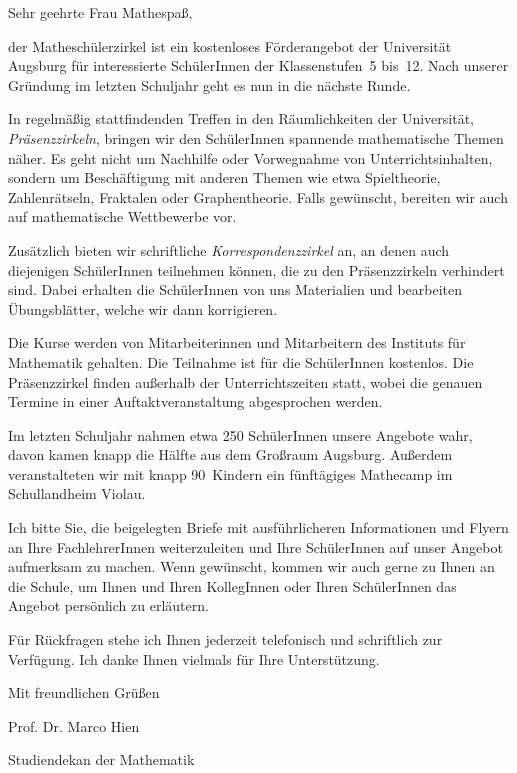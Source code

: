 \documentclass{zirkelbrief}
\begin{document}
\renewcommand{\anschrift}{%
      Holbein-Gymnasium Augsburg \\
      Fachbereich Mathematik \\
      Hallstraße 10 \\
      86150 Augsburg}
\renewcommand{\datum}{22.9.2014}
\renewcommand{\betreff}{Matheschülerzirkel der Universität Augsburg}

\makeletterhead

Sehr geehrte Frau Mathespaß,

der Matheschülerzirkel ist ein kostenloses Förderangebot der Universität Augsburg für interessierte SchülerInnen
der Klassenstufen~5 bis~12. Nach unserer Gründung im letzten Schuljahr geht es nun in die nächste Runde.

In regelmäßig stattfindenden Treffen in den Räum\-lich\-kei\-ten der Universität, \emph{Präsenzzirkeln}, bringen wir
den SchülerInnen spannende mathematische Themen
näher. Es geht nicht um Nachhilfe oder Vorwegnahme von
Unterrichtsinhalten, sondern um Beschäftigung mit anderen Themen wie etwa
Spieltheorie, Zahlenrätseln, Fraktalen oder Graphentheorie. Falls gewünscht,
bereiten wir auch auf mathematische Wettbewerbe vor.

Zusätzlich bieten wir schriftliche \emph{Korrespondenzzirkel} an, an denen auch diejenigen Schü\-ler\-In\-nen teilnehmen können, die zu den Präsenzzirkeln verhindert sind. Dabei erhalten die SchülerInnen von uns
Materialien und bearbeiten Übungsblätter, welche wir dann korrigieren.

Die Kurse werden von Mitarbeiterinnen und Mitarbeitern des
Instituts für Mathematik gehalten. Die Teilnahme ist für die SchülerInnen kostenlos. Die Präsenzzirkel finden
außerhalb der Unterrichtszeiten statt, wobei die genauen Termine in einer
Auftaktveranstaltung abgesprochen werden.

Im letzten Schuljahr nahmen etwa 250 SchülerInnen unsere
Angebote wahr, davon kamen knapp die Hälfte aus dem Großraum Augsburg. Außerdem veranstalteten wir mit knapp 90~Kindern ein fünftägiges Mathecamp im Schullandheim Violau.

Ich bitte Sie, die beigelegten Briefe mit ausführlicheren Informationen und Flyern an Ihre
FachlehrerInnen weiterzuleiten und Ihre SchülerInnen auf unser
Angebot aufmerksam zu machen. Wenn gewünscht, kommen wir auch gerne zu Ihnen an die
Schule, um Ihnen und Ihren KollegInnen oder Ihren SchülerInnen das
Angebot persönlich zu erläutern.

Für Rückfragen stehe ich Ihnen jederzeit telefonisch und schriftlich
zur Verfügung. Ich danke Ihnen vielmals für Ihre Unterstützung.

Mit freundlichen Grüßen

\vspace{1cm}

Prof. Dr. Marco Hien

\vspace{-0.2cm}

{\small Studiendekan der Mathematik}
\end{document}
